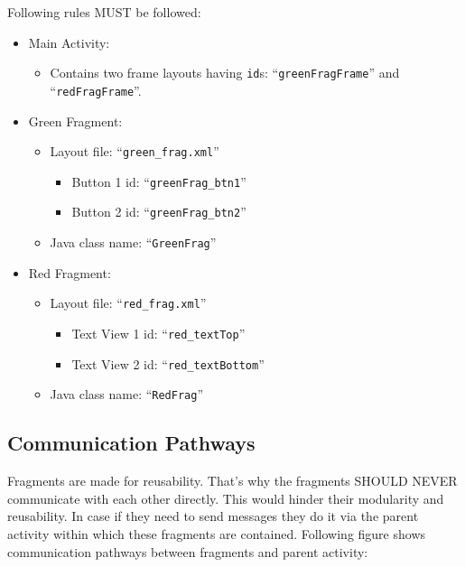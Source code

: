 Following rules MUST be followed:
\begin{itemize}
	\item Main Activity:
	\begin{itemize}
		\item Contains two frame layouts having \texttt{id}s: ``\texttt{greenFragFrame}'' and ``\texttt{redFragFrame}''.
	\end{itemize}

	\item Green Fragment:
	\begin{itemize}
		\item Layout file: ``\texttt{green\_frag.xml}''
		\begin{itemize}
			\item Button 1 id: ``\texttt{greenFrag\_btn1}''
			\item Button 2 id: ``\texttt{greenFrag\_btn2}''
		\end{itemize}
		
		\item Java class name: ``\texttt{GreenFrag}''
	\end{itemize}
	
	\item Red Fragment:
		\begin{itemize}
			\item Layout file: ``\texttt{red\_frag.xml}''
			\begin{itemize}
				\item Text View 1 id: ``\texttt{red\_textTop}''
				\item Text View 2 id: ``\texttt{red\_textBottom}''
			\end{itemize}
			
			\item Java class name: ``\texttt{RedFrag}''
		\end{itemize}
\end{itemize}

\subsection{Communication Pathways}
\label{FRAG:communicationPathways}

Fragments are made for reusability. That's why the fragments SHOULD NEVER communicate with each other directly. This would hinder their modularity and reusability. In case if they need to send messages they do it via the parent activity within which these fragments are contained. Following figure shows communication pathways between fragments and parent activity:


